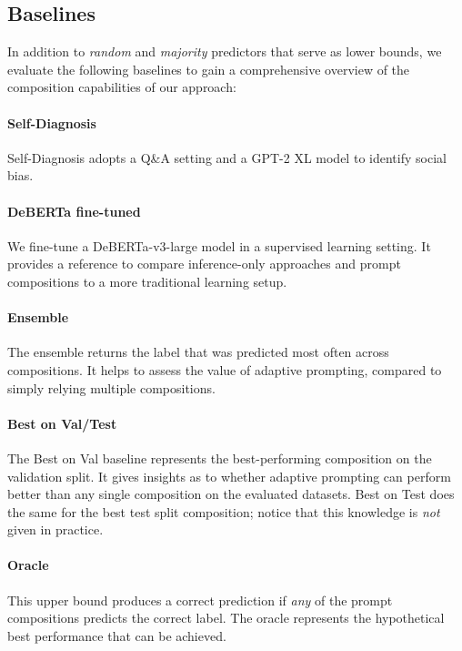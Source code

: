 \subsection{Baselines}
\label{sec:experiments:baselines}

In addition to \emph{random} and \emph{majority} predictors that serve as lower bounds, we evaluate the following baselines to gain a comprehensive overview of the composition capabilities of our approach:


\paragraph{Self-Diagnosis}
Self-Diagnosis \cite{schick2021} adopts a Q\&A setting and a GPT-2 XL model \cite{radford2019} to identify social bias.

\paragraph{DeBERTa fine-tuned}
We fine-tune a DeBERTa-v3-large model \cite{he2023} in a supervised learning setting. It provides a reference to compare inference-only approaches and prompt compositions to a more traditional learning setup.

\paragraph{Ensemble}
The ensemble returns the label that was predicted most often across compositions. It helps to assess the value of adaptive prompting, compared to simply relying multiple compositions.


\paragraph{Best on Val/Test}
The Best on Val baseline represents the best-performing composition on the validation split. It gives insights as to whether adaptive prompting can perform better than any single composition on the evaluated datasets. Best on Test does the same for the best test split composition; notice that this knowledge is \emph{not} given in practice.

\paragraph{Oracle}
This upper bound produces a correct prediction if \emph{any} of the prompt compositions predicts the correct label. The oracle represents the hypothetical best performance that can be achieved.
